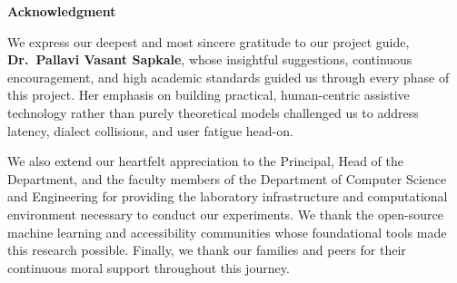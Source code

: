 \newpage
\begin{center}
{\Large\textbf{Acknowledgment}}\\[10pt]
\end{center}
We express our deepest and most sincere gratitude to our project guide, \textbf{Dr.~Pallavi Vasant Sapkale}, whose insightful suggestions, continuous encouragement, and high academic standards guided us through every phase of this project. Her emphasis on building practical, human-centric assistive technology rather than purely theoretical models challenged us to address latency, dialect collisions, and user fatigue head-on.

We also extend our heartfelt appreciation to the Principal, Head of the Department, and the faculty members of the Department of Computer Science and Engineering for providing the laboratory infrastructure and computational environment necessary to conduct our experiments. We thank the open-source machine learning and accessibility communities whose foundational tools made this research possible. Finally, we thank our families and peers for their continuous moral support throughout this journey.

